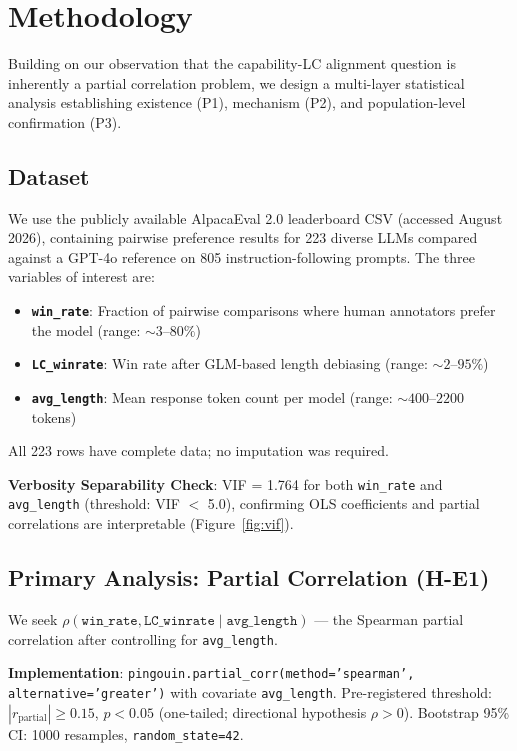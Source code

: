 \section{Methodology}
\label{sec:methodology}

Building on our observation that the capability-LC alignment question is inherently a partial
correlation problem, we design a multi-layer statistical analysis establishing existence (P1),
mechanism (P2), and population-level confirmation (P3).

\subsection{Dataset}

We use the publicly available AlpacaEval 2.0 leaderboard CSV (accessed August 2026),
containing pairwise preference results for 223 diverse LLMs compared against a GPT-4o reference
on 805 instruction-following prompts. The three variables of interest are:

\begin{itemize}
  \item \textbf{\texttt{win\_rate}}: Fraction of pairwise comparisons where human annotators
    prefer the model (range: ${\sim}3$--$80\%$)
  \item \textbf{\texttt{LC\_winrate}}: Win rate after GLM-based length debiasing
    \citep{Dubois2024LengthControlled} (range: ${\sim}2$--$95\%$)
  \item \textbf{\texttt{avg\_length}}: Mean response token count per model
    (range: ${\sim}400$--$2200$ tokens)
\end{itemize}

All 223 rows have complete data; no imputation was required.

\textbf{Verbosity Separability Check}: VIF = 1.764 for both \texttt{win\_rate} and
\texttt{avg\_length} (threshold: VIF $<$ 5.0), confirming OLS coefficients and partial
correlations are interpretable (Figure~\ref{fig:vif}).

\subsection{Primary Analysis: Partial Correlation (H-E1)}

We seek $\rho(\texttt{win\_rate}, \texttt{LC\_winrate} \mid \texttt{avg\_length})$ --- the
Spearman partial correlation after controlling for \texttt{avg\_length}.

\textbf{Implementation}: \texttt{pingouin.partial\_corr(method='spearman', alternative='greater')}
with covariate \texttt{avg\_length}. Pre-registered threshold: $|r_{\mathrm{partial}}| \geq 0.15$,
$p < 0.05$ (one-tailed; directional hypothesis $\rho > 0$). Bootstrap 95\% CI: 1000 resamples,
\texttt{random\_state=42}.

